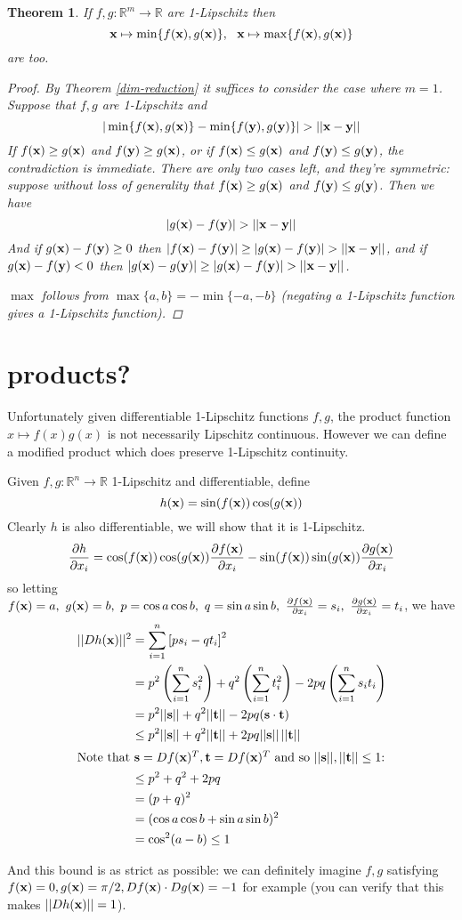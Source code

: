 \documentclass{article}
\newcommand\bb\mathbb
\renewcommand\vec\textbf
\renewcommand\l\left
\renewcommand\r\right
\newtheorem{theorem}{Theorem}
\newcommand\pp[2]{\frac{\partial #1}{\partial #2}}
\begin{document}
\begin{theorem}
\label{minmax}
If $f,g:\bb R^m\to\bb R$ are 1-Lipschitz then
$$\vec x\mapsto \min\{f(\vec x),g(\vec x)\},~~\vec x\mapsto \max\{f(\vec x),g(\vec x)\}$$
are too.
\begin{proof}
By Theorem \ref{dim-reduction} it suffices to consider the case where $m=1$.
Suppose that $f,g$ are 1-Lipschitz and
$$|\min\{f(\vec x),g(\vec x)\} - \min\{f(\vec y),g(\vec y)\}| > ||\vec x-\vec y||$$
If $f(\vec x) \geq g(\vec x)$ and $f(\vec y) \geq g(\vec x)$, or if $f(\vec x) \leq g(\vec x)$ and $f(\vec y) \leq g(\vec y)$,
the contradiction is immediate. There are only two cases left, and they're symmetric:
suppose without loss of generality that $f(\vec x) \geq g(\vec x)$ and $f(\vec y)\leq g(\vec y)$. Then
we have
$$|g(\vec x) - f(\vec y)| > ||\vec x-\vec y||$$
And if $g(\vec x)-f(\vec y) \geq 0$ then $|f(\vec x) - f(\vec y)| \geq |g(\vec x) - f(\vec y)| > ||\vec x-\vec y||$,
and if $g(\vec x)-f(\vec y) < 0$ then $|g(\vec x) - g(\vec y)| \geq |g(\vec x) - f(\vec y)| > ||\vec x-\vec y||$.

$\max$ follows from $\max\{a,b\} = -\min\{-a,-b\}$ (negating a 1-Lipschitz function gives
a 1-Lipschitz function).
\end{proof}
\end{theorem}


\section{products?}
Unfortunately given differentiable 1-Lipschitz functions $f,g$, the product function $x\mapsto f(x)g(x)$
is not necessarily Lipschitz continuous. However we can define a modified product which does
preserve 1-Lipschitz continuity.

Given $f,g:\bb R^n \to \bb R$ 1-Lipschitz and differentiable, define
$$h(\vec x) = \sin (f(\vec x))\cos(g(\vec x))$$
Clearly $h$ is also differentiable, we will show that it is 1-Lipschitz.
$$\pp h{x_i} = \cos(f(\vec x))\cos(g(\vec x)) \pp{f(\vec x)}{x_i}- \sin(f(\vec x))\sin(g(\vec x))  \pp{g(\vec x)}{x_i}$$
so letting $f(\vec x) = a,~g(\vec x)= b,~p = \cos a\cos b,~q = \sin a\sin b,~\pp{f(\vec x)}{x_i} = s_i,~\pp{g(\vec x)}{x_i} = t_i$, we have
\begin{align*}
||Dh(\vec x)||^2 &= \sum_{i=1}^n \left[ps_i - qt_i\right]^2\\
&=p^2\l(\sum_{i=1}^n  s_i^2\r) +  q^2\l(\sum_{i=1}^n  t_i^2\r)- 2pq\l(\sum_{i=1}^n s_it_i\r)\\
&=p^2||\vec s|| + q^2||\vec t||- 2pq(\vec s\cdot \vec t)\\
&\leq p^2||\vec s|| + q^2||\vec t||+ 2pq||\vec s||\,||\vec t||\\
\intertext{Note that $\vec s = Df(\vec x)^T,\vec t=Df(\vec x)^T$ and so $||\vec s||,||\vec t|| \leq 1$:}
&\leq p^2 + q^2 + 2pq\\
&= (p+q)^2\\
&= (\cos a\cos b + \sin a\sin b)^2\\
&= \cos^2(a-b) \leq 1
\end{align*}

And this bound is as strict as possible: we can definitely imagine $f,g$ satisfying
$f(\vec x) = 0,g(\vec x)=\pi/2, Df(\vec x)\cdot Dg(\vec x) = -1$ for example (you can verify that this
makes $||Dh(\vec x)|| = 1$).
\end{document}

